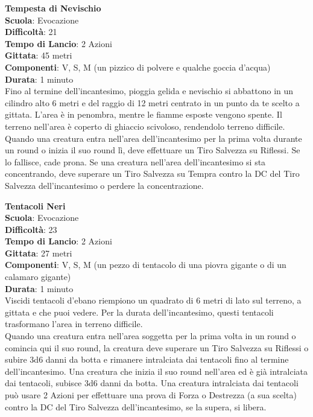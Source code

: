 \begin{multicols}{2}
\medskip\textbf{Tempesta di Nevischio}\\
\textbf{Scuola}: Evocazione\\
\textbf{Difficoltà}: 21\\
\textbf{Tempo di Lancio}: 2 Azioni\\
\textbf{Gittata}: 45 metri\\
\textbf{Componenti}: V, S, M (un pizzico di polvere e qualche goccia d'acqua)\\
\textbf{Durata}: 1 minuto\\
Fino al termine dell'incantesimo, pioggia gelida e nevischio si abbattono in un cilindro alto 6 metri e del raggio di 12 metri centrato in un punto da te scelto a gittata. L'area è in penombra, mentre le fiamme esposte vengono spente. Il terreno nell'area è coperto di ghiaccio scivoloso, rendendolo terreno difficile. Quando una creatura entra nell'area dell'incantesimo per la prima volta durante un round o inizia il suo round lì, deve effettuare un Tiro Salvezza su Riflessi. Se lo fallisce, cade prona. Se una creatura nell'area dell'incantesimo si sta concentrando, deve superare un Tiro Salvezza su Tempra contro la DC del Tiro Salvezza dell'incantesimo o perdere la concentrazione. 

\medskip\textbf{Tentacoli Neri}\\
\textbf{Scuola}: Evocazione\\
\textbf{Difficoltà}: 23\\
\textbf{Tempo di Lancio}: 2 Azioni\\
\textbf{Gittata}: 27 metri\\
\textbf{Componenti}: V, S, M (un pezzo di tentacolo di una piovra gigante o di un calamaro gigante)\\
\textbf{Durata}: 1 minuto\\
Viscidi tentacoli d'ebano riempiono un quadrato di 6 metri di lato sul terreno, a gittata e che puoi vedere. Per la durata dell'incantesimo, questi tentacoli trasformano l'area in terreno difficile.\\
Quando una creatura entra nell'area soggetta per la prima volta in un round o comincia qui il suo round, la creatura deve superare un Tiro Salvezza su Riflessi o subire 3d6 danni da botta e rimanere intralciata dai tentacoli fino al termine dell'incantesimo. Una creatura che inizia il suo round nell'area ed è già intralciata dai tentacoli, subisce 3d6 danni da botta. Una creatura intralciata dai tentacoli può usare 2 Azioni per effettuare una prova di Forza o Destrezza (a sua scelta) contro la DC del Tiro Salvezza dell'incantesimo, se la supera, si libera.


\end{multicols}
